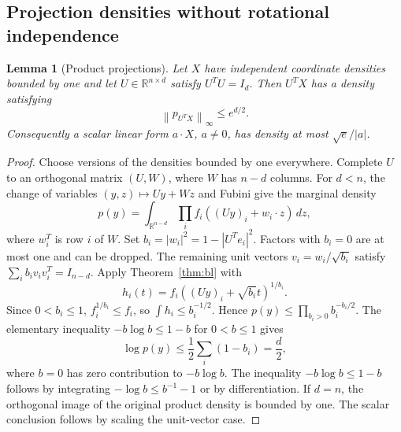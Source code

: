 \documentclass[11pt]{article}
\numberwithin{equation}{section}
\newtheorem{lemma}[theorem]{Lemma}
\theoremstyle{definition}\newtheorem{definition}[theorem]{Definition}
\theoremstyle{remark}\newtheorem{remark}[theorem]{Remark}
\newcommand{\R}{\mathbb R}\newcommand{\E}{\mathbb E}\newcommand{\PP}{\mathbb P}
\newcommand{\1}{\mathbf 1}\newcommand{\diag}{\operatorname{diag}}
\newcommand{\norm}[1]{\left\lVert#1\right\rVert}\newcommand{\abs}[1]{\left|#1\right|}
\begin{document}
\subsection{Projection densities without rotational independence}
\begin{lemma}[Product projections]\label{lem:projection}
Let $X$ have independent coordinate densities bounded by one and let $U\in\R^{n\times d}$ satisfy $U^TU=I_d$. Then $U^TX$ has a density satisfying
\begin{equation}\label{eq:projection}
 \norm{p_{U^TX}}_\infty\le e^{d/2}.
\end{equation}
Consequently a scalar linear form $a\cdot X$, $a\ne0$, has density at most $\sqrt e/|a|$.
\end{lemma}
\begin{proof}
Choose versions of the densities bounded by one everywhere. Complete $U$ to an orthogonal matrix $(U,W)$, where $W$ has $n-d$ columns. For $d<n$, the change of variables $(y,z)\mapsto Uy+Wz$ and Fubini give the marginal density
\[
 p(y)=\int_{\R^{n-d}}\prod_i f_i((Uy)_i+w_i\cdot z)\,dz,
\]
where $w_i^T$ is row $i$ of $W$. Set $b_i=|w_i|^2=1-|U^Te_i|^2$. Factors with $b_i=0$ are at most one and can be dropped. The remaining unit vectors $v_i=w_i/\sqrt{b_i}$ satisfy
$\sum_i b_i v_i v_i^T=I_{n-d}$. Apply Theorem~\ref{thm:bl} with
\[
 h_i(t)=f_i((Uy)_i+\sqrt{b_i}t)^{1/b_i}.
\]
Since $0<b_i\le1$, $f_i^{1/b_i}\le f_i$, so $\int h_i\le b_i^{-1/2}$. Hence
$p(y)\le\prod_{b_i>0} b_i^{-b_i/2}$.
The elementary inequality $-b\log b\le1-b$ for $0<b\le1$ gives
\[
 \log p(y)\le\frac12\sum_i(1-b_i)=\frac d2,
\]
where $b=0$ has zero contribution to $-b\log b$. The inequality $-b\log b\le1-b$ follows by integrating $-\log b\le b^{-1}-1$ or by differentiation. If $d=n$, the orthogonal image of the original product density is bounded by one. The scalar conclusion follows by scaling the unit-vector case.
\end{proof}
\end{document}
